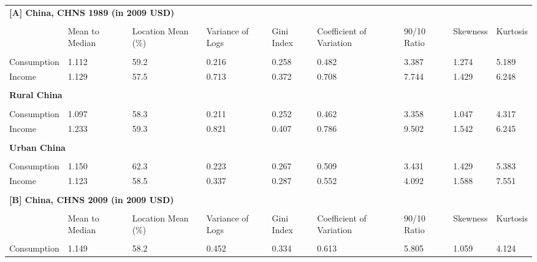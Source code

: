 \begin{tabular}{l p{1.4cm} p{1.4cm} p{1.4cm} p{1.4cm} p{1.4cm} p{1.4cm} p{1.4cm} p{1.4cm}}
\toprule
\multicolumn{9}{l}{\textbf{[A] China, CHNS 1989 (in 2009 USD)}} \\
\\
                        & Mean to Median  & Location Mean (\%) & Variance of Logs      & Gini Index       & Coefficient of Variation   &   90/10 Ratio    &    Skewness        &   Kurtosis            \\
\midrule \\
Consumption & 1.112             & 59.2           & 0.216          & 0.258         &   0.482                         &   3.387         &    1.274        &  5.189          \\
Income      & 1.129    & 57.5          & 0.713         & 0.372    &   0.708                    &   7.744        &    1.429       &  6.248         \\
\\
\multicolumn{9}{l}{\textbf{Rural China}} \\
\midrule \\
Consumption & 1.097   & 58.3         & 0.211        & 0.252    &   0.462                  &   3.358       &    1.047      &  4.317        \\
Income      & 1.233  & 59.3        & 0.821       & 0.407   &   0.786                 &   9.502      &    1.542     &  6.245       \\
\\
\multicolumn{9}{l}{\textbf{Urban China}} \\
\midrule \\
Consumption & 1.150   & 62.3         & 0.223        & 0.267    &   0.509                  &   3.431       &    1.429      &  5.383        \\
Income      & 1.123  & 58.5        & 0.337       & 0.287   &   0.552                 &   4.092      &    1.588     &  7.551       \\
\\
\multicolumn{9}{l}{\textbf{[B] China, CHNS 2009 (in 2009 USD)}} \\
\\
                        & Mean to Median  & Location Mean (\%) & Variance of Logs      & Gini Index       & Coefficient of Variation   &   90/10 Ratio    &    Skewness        &   Kurtosis            \\
\midrule \\
Consumption & 1.149             & 58.2           & 0.452          & 0.334         &   0.613                         &   5.805         &    1.059        &  4.124          \\

\end{tabular}
